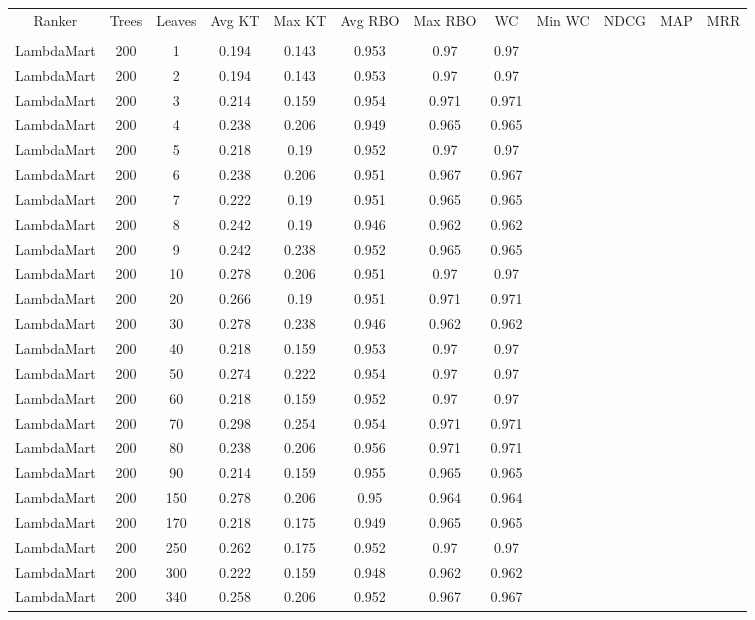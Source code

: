 \begin{longtable}{*{12}{c}}
Ranker & Trees & Leaves & Avg KT & Max KT & Avg RBO & Max RBO & WC & Min WC & NDCG & MAP & MRR  \\\\ 
LambdaMart & 200 & 1 & 0.194 & 0.143 & 0.953 & 0.97 & 0.97 \\ 
LambdaMart & 200 & 2 & 0.194 & 0.143 & 0.953 & 0.97 & 0.97 \\ 
LambdaMart & 200 & 3 & 0.214 & 0.159 & 0.954 & 0.971 & 0.971 \\ 
LambdaMart & 200 & 4 & 0.238 & 0.206 & 0.949 & 0.965 & 0.965 \\ 
LambdaMart & 200 & 5 & 0.218 & 0.19 & 0.952 & 0.97 & 0.97 \\ 
LambdaMart & 200 & 6 & 0.238 & 0.206 & 0.951 & 0.967 & 0.967 \\ 
LambdaMart & 200 & 7 & 0.222 & 0.19 & 0.951 & 0.965 & 0.965 \\ 
LambdaMart & 200 & 8 & 0.242 & 0.19 & 0.946 & 0.962 & 0.962 \\ 
LambdaMart & 200 & 9 & 0.242 & 0.238 & 0.952 & 0.965 & 0.965 \\ 
LambdaMart & 200 & 10 & 0.278 & 0.206 & 0.951 & 0.97 & 0.97 \\ 
LambdaMart & 200 & 20 & 0.266 & 0.19 & 0.951 & 0.971 & 0.971 \\ 
LambdaMart & 200 & 30 & 0.278 & 0.238 & 0.946 & 0.962 & 0.962 \\ 
LambdaMart & 200 & 40 & 0.218 & 0.159 & 0.953 & 0.97 & 0.97 \\ 
LambdaMart & 200 & 50 & 0.274 & 0.222 & 0.954 & 0.97 & 0.97 \\ 
LambdaMart & 200 & 60 & 0.218 & 0.159 & 0.952 & 0.97 & 0.97 \\ 
LambdaMart & 200 & 70 & 0.298 & 0.254 & 0.954 & 0.971 & 0.971 \\ 
LambdaMart & 200 & 80 & 0.238 & 0.206 & 0.956 & 0.971 & 0.971 \\ 
LambdaMart & 200 & 90 & 0.214 & 0.159 & 0.955 & 0.965 & 0.965 \\ 
LambdaMart & 200 & 150 & 0.278 & 0.206 & 0.95 & 0.964 & 0.964 \\ 
LambdaMart & 200 & 170 & 0.218 & 0.175 & 0.949 & 0.965 & 0.965 \\ 
LambdaMart & 200 & 250 & 0.262 & 0.175 & 0.952 & 0.97 & 0.97 \\ 
LambdaMart & 200 & 300 & 0.222 & 0.159 & 0.948 & 0.962 & 0.962 \\ 
LambdaMart & 200 & 340 & 0.258 & 0.206 & 0.952 & 0.967 & 0.967 \\ 

\end{longtable}
